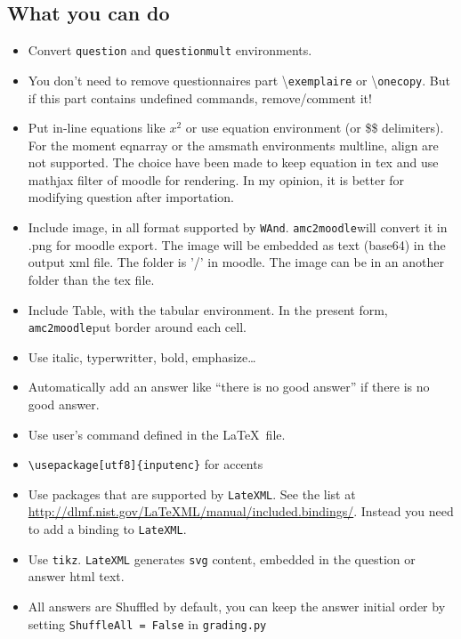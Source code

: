 \documentclass[a4paper]{article}
\newcommand{\amc}{\texttt{amc2moodle}}
\begin{document}
\subsection{What you can do}
\begin{itemize}
\item Convert \texttt{question} and \texttt{questionmult} environments.
\item You don't need to remove questionnaires part \textbackslash \texttt{exemplaire} or \textbackslash \texttt{onecopy}. But if this part contains undefined commands, remove/comment it!
\item Put in-line equations like $x^2$ or use equation environment (or \$\$ delimiters). For the moment eqnarray  or the amsmath environments multline, align are not supported. The choice have been made to keep equation in tex and use mathjax filter of moodle for rendering. In my opinion, it is better for modifying question after importation.
\item Include image, in all format supported by \texttt{WAnd}. \amc   will convert it in .png for moodle export. The image will be embedded as text (base64) in the output xml file. The folder is '/' in moodle. The image can be in an another folder than the tex file.
\item Include Table, with the tabular environment. In the present form, \amc put  border around each cell.
\item Use italic, typerwritter, bold, emphasize\dots
\item Automatically add an answer like ``there is no good answer'' if there is no good answer.
\item Use user's command defined in the \LaTeX~file.
\item \texttt{\textbackslash usepackage[utf8]\{inputenc\}}   for accents
\item Use packages that are supported by \texttt{LateXML}. See the list at \url{http://dlmf.nist.gov/LaTeXML/manual/included.bindings/}. Instead you need to add a binding to \texttt{LateXML}.
\item Use \texttt{tikz}. \texttt{LateXML} generates \texttt{svg} content, embedded in the question or answer html text.
\item All answers are Shuffled by default, you can keep the answer initial order by setting \texttt{ShuffleAll = False} in \texttt{grading.py}
\end{itemize}
\end{document}
